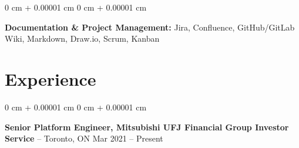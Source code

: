 \documentclass[11pt, letterpaper]{article}
\newenvironment{onecolentry}{
    \begin{adjustwidth}{
        0 cm + 0.00001 cm
    }{
        0 cm + 0.00001 cm
    }
}{
    \end{adjustwidth}
} %
\newenvironment{twocolentry}[2][]{
    \onecolentry
    \def\secondColumn{#2}
    \setcolumnwidth{\fill, 4.5 cm}
    \begin{paracol}{2}
}{
    \switchcolumn \raggedleft \secondColumn
    \end{paracol}
    \endonecolentry
} %
\begin{document}
       \begin{onecolentry}
            \textbf{Documentation \& Project Management:} Jira, Confluence, GitHub/GitLab Wiki, Markdown, Draw.io, Scrum, Kanban

            
        \end{onecolentry}  
        



    

    
    \section{Experience}

        \begin{twocolentry}{
            Mar 2021 – Present
        }
            \textbf{Senior Platform Engineer, Mitsubishi UFJ Financial Group Investor Service}  -- Toronto, ON\end{twocolentry}
\end{document}
